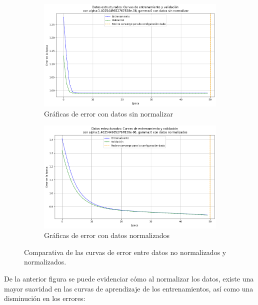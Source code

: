 \documentclass{article}
\begin{document}
\begin{figure}[htbp]
    \centering
    \begin{subfigure}{0.49\textwidth}
        \includegraphics[width=\linewidth]{imgs/structured/basic.png}
        \caption{Gráficas de error con datos sin normalizar}
        \label{fig:basic}
    \end{subfigure}
    \hfill
    \begin{subfigure}{0.49\textwidth}
       \includegraphics[width=\linewidth]{imgs/structured/normalized.png}
        \caption{Gráficas de error con datos normalizados}
        \label{fig:normalized}
    \end{subfigure}
    \caption{Comparativa de las curvas de error entre datos no normalizados y normalizados.}
    \label{fig:comparativa}
\end{figure}

De la anterior figura se puede evidenciar cómo al normalizar los datos, existe una mayor suavidad en las curvas de aprendizaje de los entrenamientos, así como una disminución en los errores:
\end{document}
